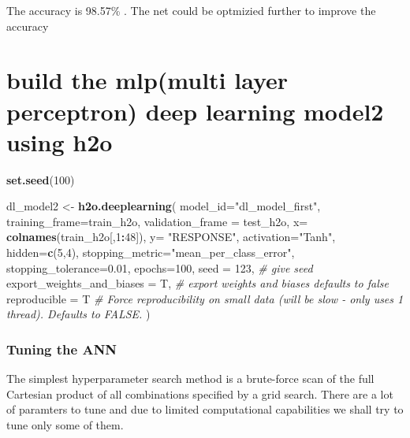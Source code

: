 \documentclass[]{article}
\newenvironment{Shaded}{\begin{snugshade}}{\end{snugshade}}
\newcommand{\KeywordTok}[1]{\textcolor[rgb]{0.13,0.29,0.53}{\textbf{#1}}}
\newcommand{\DataTypeTok}[1]{\textcolor[rgb]{0.13,0.29,0.53}{#1}}
\newcommand{\DecValTok}[1]{\textcolor[rgb]{0.00,0.00,0.81}{#1}}
\newcommand{\FloatTok}[1]{\textcolor[rgb]{0.00,0.00,0.81}{#1}}
\newcommand{\StringTok}[1]{\textcolor[rgb]{0.31,0.60,0.02}{#1}}
\newcommand{\CommentTok}[1]{\textcolor[rgb]{0.56,0.35,0.01}{\textit{#1}}}
\newcommand{\OperatorTok}[1]{\textcolor[rgb]{0.81,0.36,0.00}{\textbf{#1}}}
\newcommand{\NormalTok}[1]{#1}
\begin{document}
The accuracy is 98.57\% . The net could be optmizied further to improve
the accuracy

\section{build the mlp(multi layer perceptron) deep learning model2
using
h2o}\label{build-the-mlpmulti-layer-perceptron-deep-learning-model2-using-h2o}

\begin{Shaded}
\begin{Highlighting}[]
\KeywordTok{set.seed}\NormalTok{(}\DecValTok{100}\NormalTok{)}

\NormalTok{dl_model2 <-}\StringTok{ }\KeywordTok{h2o.deeplearning}\NormalTok{(}
  \DataTypeTok{model_id=}\StringTok{"dl_model_first"}\NormalTok{, }
  \DataTypeTok{training_frame=}\NormalTok{train_h2o, }
  \DataTypeTok{validation_frame =}\NormalTok{ test_h2o,}
  \DataTypeTok{x=} \KeywordTok{colnames}\NormalTok{(train_h2o[,}\DecValTok{1}\OperatorTok{:}\DecValTok{48}\NormalTok{]),}
  \DataTypeTok{y=} \StringTok{"RESPONSE"}\NormalTok{,}
  \DataTypeTok{activation=}\StringTok{"Tanh"}\NormalTok{,  }
  \DataTypeTok{hidden=}\KeywordTok{c}\NormalTok{(}\DecValTok{5}\NormalTok{,}\DecValTok{4}\NormalTok{), }
  \DataTypeTok{stopping_metric=}\StringTok{"mean_per_class_error"}\NormalTok{,}
  \DataTypeTok{stopping_tolerance=}\FloatTok{0.01}\NormalTok{,}
  \DataTypeTok{epochs=}\DecValTok{100}\NormalTok{,}
  \DataTypeTok{seed =} \DecValTok{123}\NormalTok{, }\CommentTok{# give seed }
  \DataTypeTok{export_weights_and_biases =}\NormalTok{ T, }\CommentTok{# export weights and biases defaults to false}
  \DataTypeTok{reproducible =}\NormalTok{ T }\CommentTok{# Force reproducibility on small data (will be slow - only uses 1 thread). Defaults to FALSE.}
\NormalTok{)}
\end{Highlighting}
\end{Shaded}

\subsubsection{Tuning the ANN}\label{tuning-the-ann}

The simplest hyperparameter search method is a brute-force scan of the
full Cartesian product of all combinations specified by a grid search.
There are a lot of paramters to tune and due to limited computational
capabilities we shall try to tune only some of them.
\end{document}
